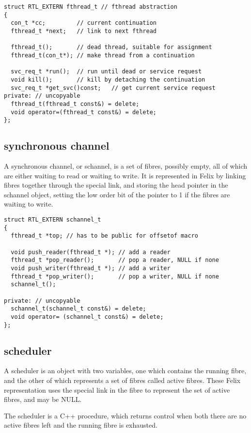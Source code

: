 \documentclass[oneside]{book}
\begin{document}
\begin{verbatim}
struct RTL_EXTERN fthread_t // fthread abstraction
{
  con_t *cc;         // current continuation
  fthread_t *next;   // link to next fthread

  fthread_t();       // dead thread, suitable for assignment
  fthread_t(con_t*); // make thread from a continuation

  svc_req_t *run();  // run until dead or service request
  void kill();       // kill by detaching the continuation
  svc_req_t *get_svc()const;   // get current service request
private: // uncopyable
  fthread_t(fthread_t const&) = delete;
  void operator=(fthread_t const&) = delete;
};
\end{verbatim}

\subsection{synchronous channel}
A synchronous channel, or schannel, is a set of fibres, possibly empty,
all of which are either waiting to read or waiting to write. It is represented
in Felix by linking fibres together through the special link, and storing
the head pointer in the schannel object, setting the low order bit of the
pointer to 1 if the fibres are waiting to write.

\begin{verbatim}
struct RTL_EXTERN schannel_t
{
  fthread_t *top; // has to be public for offsetof macro

  void push_reader(fthread_t *); // add a reader
  fthread_t *pop_reader();       // pop a reader, NULL if none
  void push_writer(fthread_t *); // add a writer
  fthread_t *pop_writer();       // pop a writer, NULL if none
  schannel_t();

private: // uncopyable
  schannel_t(schannel_t const&) = delete;
  void operator= (schannel_t const&) = delete;
};
\end{verbatim}

\subsection{scheduler}
A scheduler is an object with two variables, one which contains
the running fibre, and the other of which represents a set of fibres
called active fibres. These Felix representation uses the special link
in the fibre to represent the set of active fibres, and may be NULL.

The scheduler is a C++ procedure, which returns control when both there
are no active fibres left and the running fibre is exhausted.
\end{document}
